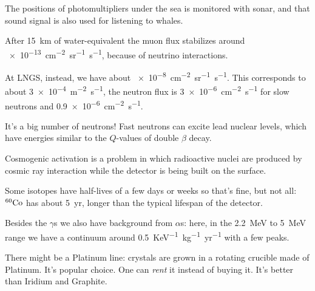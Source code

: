 \documentclass[main.tex]{subfiles}
\begin{document}
The positions of photomultipliers under the sea is monitored with sonar, and that sound signal is also used for listening to whales. 

After \SI{15}{km} of water-equivalent the muon flux stabilizes around \SI{e-13}{cm^{-2} sr^{-1} s^{-1}}, because of neutrino interactions. 

At LNGS, instead, we have about \SI{e-8}{cm^{-2} sr^{-1} s^{-1}}. This corresponds to about \SI{3e-4}{m^{-2} s^{-1}}, the neutron flux is \SI{3e-6}{cm^{-2}s^{-1}} for slow neutrons and \SI{.9e-6}{cm^{-2} s^{-1}}. 

It's a big number of neutrons! 
Fast neutrons can excite lead nuclear levels, which have energies similar to the \(Q\)-values of double \(\beta \) decay. 

Cosmogenic activation is a problem in which radioactive nuclei are produced by cosmic ray interaction while the detector is being built on the surface.

Some isotopes have half-lives of a few days or weeks so that's fine, but not all: \(^{60} \ce{Co}\) has about \SI{5}{yr}, longer than the typical lifespan of the detector. 

Besides the \(\gamma \)s we also have background from \(\alpha \)s: here, in the \SI{2.2}{MeV} to \SI{5}{MeV} range we have a continuum around \SI{.5}{KeV^{-1} kg^{-1}yr^{-1}} with a few peaks. 

There might be a Platinum line: crystals are grown in a rotating crucible made of Platinum. 
It's popular choice.
One can \emph{rent} it instead of buying it. 
It's better than Iridium and Graphite. 
\end{document}
